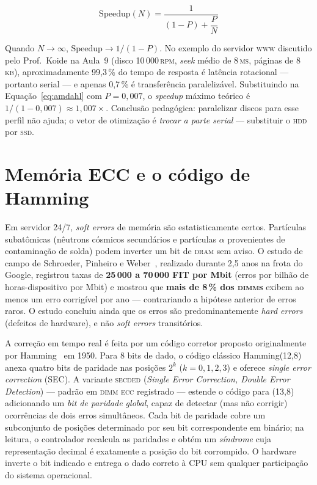 \begin{equation}
\mathrm{Speedup}(N) = \frac{1}{(1-P) + \dfrac{P}{N}}
\label{eq:amdahl}
\end{equation}

Quando $N \to \infty$, $\mathrm{Speedup} \to 1/(1-P)$. No exemplo do
servidor \textsc{www} discutido pelo Prof.\ Koide na Aula~9
(disco 10\,000\,\textsc{rpm}, \textit{seek} médio de 8\,\textsc{ms},
páginas de 8\,\textsc{kb}), aproximadamente 99,3\,\% do tempo de
resposta é latência rotacional --- portanto serial --- e apenas 0,7\,\%
é transferência paralelizável. Substituindo na Equação~\ref{eq:amdahl}
com $P = 0{,}007$, o \textit{speedup} máximo teórico é
$1/(1-0{,}007) \approx 1{,}007\times$. Conclusão pedagógica: paralelizar
discos para esse perfil não ajuda; o vetor de otimização é
\emph{trocar a parte serial} --- substituir o \textsc{hdd} por
\textsc{ssd}.

\section{Memória ECC e o código de Hamming}
\label{sec:ref-ecc}

Em servidor 24/7, \textit{soft errors} de memória são
estatisticamente certos. Partículas subatômicas (nêutrons cósmicos
secundários e partículas $\alpha$ provenientes de contaminação de
solda) podem inverter um bit de \textsc{dram} sem aviso. O estudo
de campo de Schroeder, Pinheiro e Weber~\cite{schroeder2009},
realizado durante 2,5 anos na frota do Google, registrou taxas de
\textbf{25\,000 a 70\,000 FIT por Mbit} (erros por bilhão de
horas-dispositivo por Mbit) e mostrou que \textbf{mais de 8\,\% dos
\textsc{dimm}s} exibem ao menos um erro corrigível por ano ---
contrariando a hipótese anterior de erros raros. O estudo concluiu
ainda que os erros são predominantemente \textit{hard errors}
(defeitos de hardware), e não \textit{soft errors} transitórios.

A correção em tempo real é feita por um código corretor proposto
originalmente por Hamming~\cite{hamming1950} em 1950. Para 8 bits de
dado, o código clássico Hamming(12,8) anexa quatro bits de paridade
nas posições $2^k$ ($k=0,1,2,3$) e oferece \emph{single error
correction} (SEC). A variante \textsc{secded} (\emph{Single Error
Correction, Double Error Detection}) --- padrão em \textsc{dimm}
\textsc{ecc} registrado --- estende o código para (13,8) adicionando
um \emph{bit de paridade global}, capaz de detectar (mas não corrigir)
ocorrências de dois erros simultâneos. Cada bit de paridade cobre um
subconjunto de posições determinado por seu bit correspondente em
binário; na leitura, o controlador recalcula as paridades e obtém um
\emph{síndrome} cuja representação decimal é exatamente a posição do
bit corrompido. O hardware inverte o bit indicado e entrega o dado
correto à CPU sem qualquer participação do sistema operacional.

